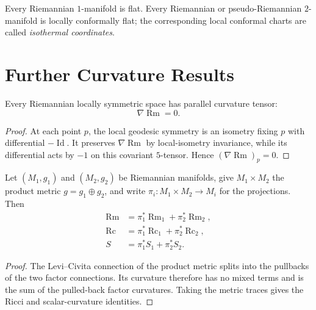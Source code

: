 Every Riemannian $1$-manifold is flat.  Every Riemannian or
pseudo-Riemannian $2$-manifold is locally conformally flat; the corresponding
local conformal charts are called \emph{isothermal coordinates}.

\section{Further Curvature Results}

\begin{proposition}
\label{prop:symmetric-space-parallel-curvature}
Every Riemannian locally symmetric space has parallel curvature tensor:
\[
\nabla\operatorname{Rm}=0.
\]
\end{proposition}
\begin{proof}
\sketch
At each point $p$, the local geodesic symmetry is an isometry fixing $p$ with
differential $-\operatorname{Id}$. It preserves $\nabla\operatorname{Rm}$ by
local-isometry invariance, while its differential acts by $-1$ on this
covariant $5$-tensor. Hence $(\nabla\operatorname{Rm})_p=0$.
\end{proof}

\begin{proposition}
\label{prop:product-metric-curvature}
Let $(M_1,g_1)$ and $(M_2,g_2)$ be Riemannian manifolds, give
$M_1\times M_2$ the product metric $g=g_1\oplus g_2$, and write
$\pi_i\colon M_1\times M_2\to M_i$ for the projections. Then
\begin{align*}
\operatorname{Rm}&=\pi_1^*\operatorname{Rm}_1+\pi_2^*\operatorname{Rm}_2,\\
\operatorname{Rc}&=\pi_1^*\operatorname{Rc}_1+\pi_2^*\operatorname{Rc}_2,\\
S&=\pi_1^*S_1+\pi_2^*S_2.
\end{align*}
\end{proposition}
\begin{proof}
\sketch
The Levi--Civita connection of the product metric splits into the pullbacks of
the two factor connections. Its curvature therefore has no mixed terms and
is the sum of the pulled-back factor curvatures. Taking the metric traces gives
the Ricci and scalar-curvature identities.
\end{proof}

